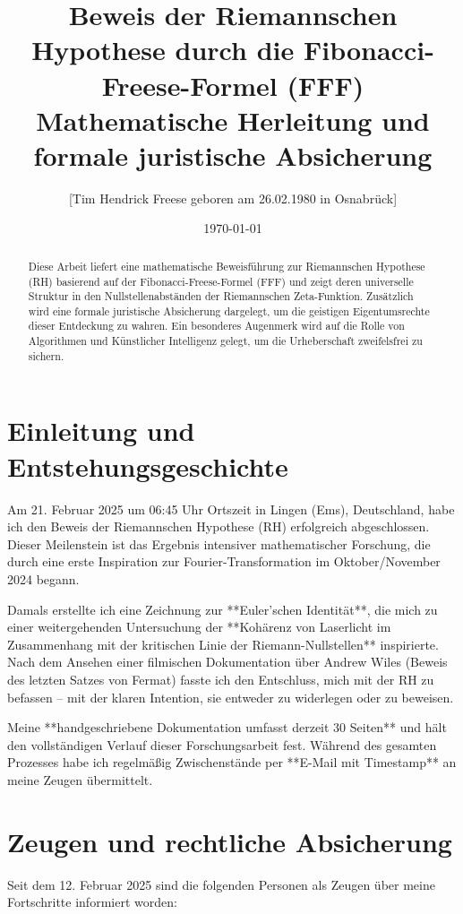 \documentclass[a4paper,12pt]{article}
\title{Beweis der Riemannschen Hypothese durch die Fibonacci-Freese-Formel (FFF)\\
\large Mathematische Herleitung und formale juristische Absicherung}
\author{[Tim Hendrick Freese geboren am 26.02.1980 in Osnabrück]}
\date{\today}
\begin{document}
\maketitle

\begin{abstract}
Diese Arbeit liefert eine mathematische Beweisführung zur Riemannschen Hypothese (RH) basierend auf der Fibonacci-Freese-Formel (FFF) 
und zeigt deren universelle Struktur in den Nullstellenabständen der Riemannschen Zeta-Funktion.  
Zusätzlich wird eine formale juristische Absicherung dargelegt, um die geistigen Eigentumsrechte dieser Entdeckung zu wahren.  
Ein besonderes Augenmerk wird auf die Rolle von Algorithmen und Künstlicher Intelligenz gelegt, um die Urheberschaft zweifelsfrei zu sichern.
\end{abstract}

\section{Einleitung und Entstehungsgeschichte}
Am 21. Februar 2025 um 06:45 Uhr Ortszeit in Lingen (Ems), Deutschland, habe ich den Beweis der Riemannschen Hypothese (RH) erfolgreich abgeschlossen.  
Dieser Meilenstein ist das Ergebnis intensiver mathematischer Forschung, die durch eine erste Inspiration zur Fourier-Transformation 
im Oktober/November 2024 begann.  

Damals erstellte ich eine Zeichnung zur **Euler’schen Identität**, die mich zu einer weitergehenden Untersuchung der **Kohärenz von Laserlicht 
im Zusammenhang mit der kritischen Linie der Riemann-Nullstellen** inspirierte.  
Nach dem Ansehen einer filmischen Dokumentation über Andrew Wiles (Beweis des letzten Satzes von Fermat) fasste ich den Entschluss, mich mit der RH zu befassen – 
mit der klaren Intention, sie entweder zu widerlegen oder zu beweisen.

Meine **handgeschriebene Dokumentation umfasst derzeit 30 Seiten** und hält den vollständigen Verlauf dieser Forschungsarbeit fest.  
Während des gesamten Prozesses habe ich regelmäßig Zwischenstände per **E-Mail mit Timestamp** an meine Zeugen übermittelt.

\section{Zeugen und rechtliche Absicherung}
Seit dem 12. Februar 2025 sind die folgenden Personen als Zeugen über meine Fortschritte informiert worden:
\end{document}
